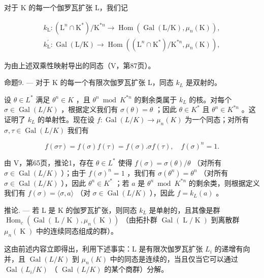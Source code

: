 对于 K 的每一个伽罗瓦扩张 L，我们记

\[
\begin{array}{l} k _ {\mathrm{L}} \colon (\mathrm{L} ^ {n} \cap \mathrm{K} ^ {*}) / \mathrm{K} ^ {* n} \to \operatorname{Hom} \left(\operatorname{Gal} (\mathrm{L} / \mathrm{K}),   \mu_ {n} (\mathrm{K})\right), \\ k _ {\mathrm{L}} ^ {\prime} \colon \operatorname{Gal} (\mathrm{L} / \mathrm{K}) \to \operatorname{Hom} \left((\mathrm{L} ^ {n} \cap \mathrm{K} ^ {*}) / \mathrm{K} ^ {* n},   \mu_ {n} (\mathrm{K})\right), \end{array}
\]

为由上述双乘性映射导出的同态（V，第87页）。

命题9. --- 对于 K 的每一个有限次伽罗瓦扩张 L，同态 \(k_{L}\) 是双射的。

设 \(\theta \in L^{*}\) 满足 \(\theta^n \in K\) ，且 \(\theta^n \bmod K^{*n}\) 的剩余类属于 \(k_{L}\) 的核。对每个 \(\sigma \in \operatorname{Gal}(L/K)\) ，根据定义我们有 \(\sigma(\theta) = \theta\) ；因此 \(\theta \in K^{*}\) 且 \(\theta^n \in K^{*n}\) 。这证明了 \(k_{L}\) 的单射性。现在设 \(f: \operatorname{Gal}(L/K) \to \mu_n(K)\) 为一个同态；对所有 \(\sigma, \tau \in \operatorname{Gal}(L/K)\) 我们有

\[
f (\sigma \tau) = f (\sigma) f (\tau) = f (\sigma). \sigma f (\tau), \quad f (\sigma) ^ {n} = 1.
\]

由 V，第65页，推论1，存在 \(\theta \in L^{*}\) 使得 \(f(\sigma) = \sigma(\theta)/\theta\) （对所有 \(\sigma \in \operatorname{Gal}(L/K)\) ）；由于 \(f(\sigma)^{n} = 1\) ，我们有 \(\sigma(\theta^{n}) = \theta^{n}\) （对所有 \(\sigma \in \operatorname{Gal}(L/K)\) ），因此 \(\theta^{n} \in K^{*}\) ；若 \(a\) 是 \(\theta^{n} \bmod K^{*n}\) 的剩余类，则根据定义我们有 \(f(\sigma) = \langle \sigma, a \rangle\) （对 \(\sigma \in \operatorname{Gal}(L/K)\) ），因此 \(f = k_{L}(a)\) 。

推论. --- 若 L 是 K 的伽罗瓦扩张，则同态 \(k_{L}\) 是单射的，且其像是群 \(\operatorname{Hom}_{c}(\operatorname{Gal}(\operatorname{L}/\operatorname{K}), \mu_{n}(\operatorname{K}))\) （由拓扑群 \(\operatorname{Gal}(\operatorname{L}/\operatorname{K})\) 到离散群 \(\mu_{n}(\operatorname{K})\) 中的连续同态组成的群）。

这由前述内容立即得出，利用下述事实：L 是有限次伽罗瓦扩张 \(L_{i}\) 的递增有向并，且 \(\operatorname{Gal}(L/K)\) 到 \(\mu_{n}(K)\) 中的同态是连续的，当且仅当它可以通过 \(\operatorname{Gal}(L_{i}/K)\) （ \(\operatorname{Gal}(L/K)\) 的某个商群）分解。

